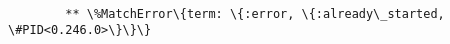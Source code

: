 \documentclass[11pt]{article}
\begin{document}
    \begin{Verbatim}[commandchars=\\\{\}]

        ** \%MatchError\{term: \{:error, \{:already\_started, \#PID<0.246.0>\}\}\}

    \end{Verbatim}


    
    
    
    
\end{document}
